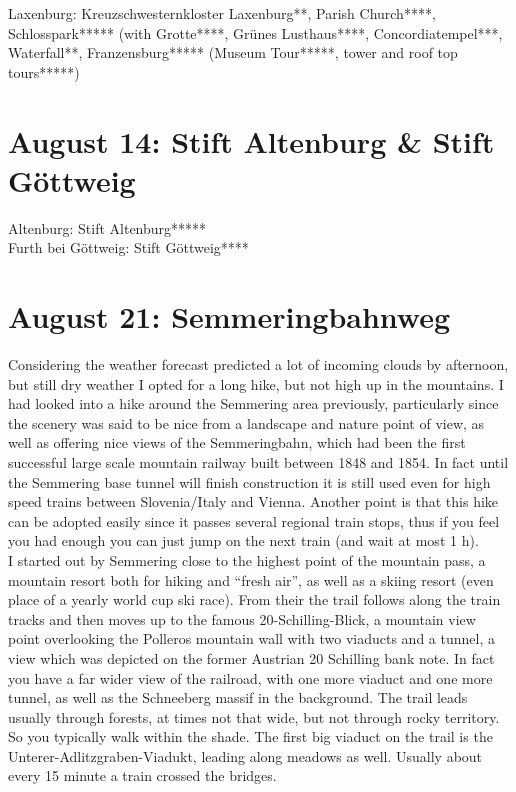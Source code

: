 {Laxenburg: Kreuzschwesternkloster Laxenburg**, Parish Church****, Schlosspark***** (with Grotte****, Gr\"unes Lusthaus****, Concordiatempel***, Waterfall**, Franzensburg***** (Museum Tour*****, tower and roof top tours*****)

\section{August 14: Stift Altenburg \& Stift G\"ottweig}
\label{2021Altenburg}

Altenburg: Stift Altenburg*****\\
Furth bei G\"ottweig: Stift G\"ottweig****

\section{August 21: Semmeringbahnweg}
\label{2021Semmering}

Considering the weather forecast predicted a lot of incoming clouds by afternoon, but still dry weather I opted for a long hike, but not high up in the mountains. I had looked into a hike around the Semmering area previously, particularly since the scenery was said to be nice from a landscape and nature point of view, as well as offering nice views of the Semmeringbahn, which had been the first successful large scale mountain railway built between 1848 and 1854. In fact until the Semmering base tunnel will finish construction it is still used even for high speed trains between Slovenia/Italy and Vienna. Another point is that this hike can be adopted easily since it passes several regional train stops, thus if you feel you had enough you can just jump on the next train (and wait at most 1 h).\\

I started out by Semmering close to the highest point of the mountain pass, a mountain resort both for hiking and ``fresh air'', as well as a skiing resort (even place of a yearly world cup ski race). From their the trail follows along the train tracks and then moves up to the famous 20-Schilling-Blick, a mountain view point overlooking the Polleros mountain wall with two viaducts and a tunnel, a view which was depicted on the former Austrian 20 Schilling bank note. In fact you have a far wider view of the railroad, with one more viaduct and one more tunnel, as well as the Schneeberg massif in the background. The trail leads usually through forests, at times not that wide, but not through rocky territory. So you typically walk within the shade. The first big viaduct on the trail is the Unterer-Adlitzgraben-Viadukt, leading along meadows as well. Usually about every 15 minute a train crossed the bridges. \\

}
